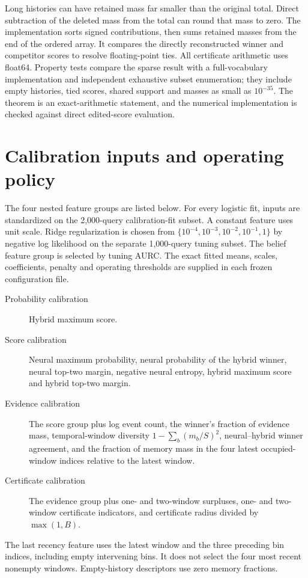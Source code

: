 \documentclass[11pt]{article}
\begin{document}
Long histories can have retained mass far smaller than the original total.
Direct subtraction of the deleted mass from the total can round that mass to
zero. The implementation sorts signed contributions, then sums retained masses
from the end of the ordered array. It compares the directly reconstructed
winner and competitor scores to resolve floating-point ties. All certificate
arithmetic uses float64. Property tests compare the sparse result with a
full-vocabulary implementation and independent exhaustive subset enumeration;
they include empty histories, tied scores, shared support and masses as small
as $10^{-35}$. The theorem is an exact-arithmetic statement, and the numerical
implementation is checked against direct edited-score evaluation.

\section{Calibration inputs and operating policy}
The four nested feature groups are listed below. For every logistic fit, inputs
are standardized on the 2,000-query calibration-fit subset. A constant feature
uses unit scale. Ridge regularization is chosen from
$\{10^{-4},10^{-3},10^{-2},10^{-1},1\}$ by negative log likelihood on the separate
1,000-query tuning subset. The belief feature group is selected by tuning AURC.
The exact fitted means, scales, coefficients, penalty and operating thresholds
are supplied in each frozen configuration file.

\begin{description}
\item[Probability calibration] Hybrid maximum score.
\item[Score calibration] Neural maximum probability, neural probability of the
hybrid winner, neural top-two margin, negative neural entropy, hybrid maximum
score and hybrid top-two margin.
\item[Evidence calibration] The score group plus log event count, the winner's
fraction of evidence mass, temporal-window diversity $1-\sum_b(m_b/S)^2$,
neural--hybrid winner agreement, and the fraction of memory mass in the four
latest occupied-window indices relative to the latest window.
\item[Certificate calibration] The evidence group plus one- and two-window
surpluses, one- and two-window certificate indicators, and certificate radius
divided by $\max(1,B)$.
\end{description}
The last recency feature uses the latest window and the three preceding bin
indices, including empty intervening bins. It does not select the four most
recent nonempty windows. Empty-history descriptors use zero memory fractions.
\end{document}
